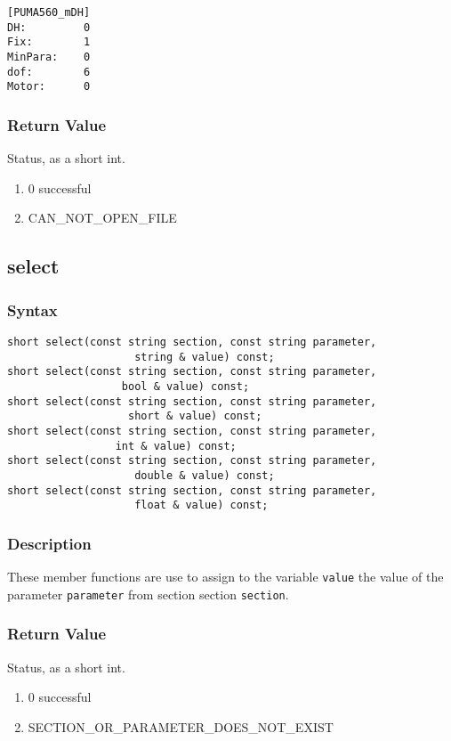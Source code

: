 \documentclass[dvips,11pt,fleqn]{report}
\begin{document}
\begin{verbatim}
[PUMA560_mDH]
DH:         0
Fix:        1
MinPara:    0
dof:        6
Motor:      0
\end{verbatim}

\subsubsection*{Return Value}
Status, as a short int.
\begin{enumerate}
\item[] 0 successful
\item[] CAN\_NOT\_OPEN\_FILE
\end{enumerate}
\newpage 

\subsection*{select}
\subsubsection*{Syntax}
\begin{verbatim}
short select(const string section, const string parameter,
                    string & value) const;
short select(const string section, const string parameter,
                  bool & value) const;
short select(const string section, const string parameter,
                   short & value) const;
short select(const string section, const string parameter,
                 int & value) const;
short select(const string section, const string parameter,
                    double & value) const;
short select(const string section, const string parameter,
                    float & value) const;
\end{verbatim}

\subsubsection*{Description}   
These member functions are use to assign to the variable
\texttt{value} the value of the parameter \texttt{parameter} from
section section \texttt{section}.

\subsubsection*{Return Value}
Status, as a short int.
\begin{enumerate}
\item[] 0 successful
\item[] SECTION\_OR\_PARAMETER\_DOES\_NOT\_EXIST
\end{enumerate}
 \newpage 
\end{document}
